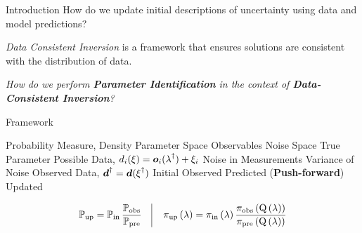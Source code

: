 \begin{block}{Introduction}
\centering
            {\large How do we update initial descriptions of uncertainty using data and model predictions?}

             {\large \emph{Data Consistent Inversion} is a framework that ensures solutions are consistent with the distribution of data.}

             {\large \emph{How do we perform \textbf{Parameter Identification} in the context of \textbf{Data-Consistent Inversion}?} }

\end{block}

\begin{block}{Framework}
\large
    \begin{itemize}
        \itembox{$ \PP, \; \pi $} Probability Measure, Density
         Parameter Space
         Observables
         Noise Space
        \itembox{$\param^\dagger\in\pspace$} True Parameter
         Possible Data, $d_i(\operatorname*{\xi}) = \boldsymbol{o}_i(\operatorname*{\lambda}^\dagger) + \xi_i$
        \itembox{$\noise^\dagger\in\nspace$} Noise in Measurements
        \itembox{$ \sigma $} Variance of Noise
         Observed Data, $\boldsymbol{d}^\dagger = \boldsymbol{d}(\operatorname*{\xi}^\dagger)$
        \itembox{$ \initialP, \; \initial $} Initial
        \itembox{$ \observedP, \; \observed $} Observed
        \itembox{$ \predictedP, \; \predicted $} Predicted (\textbf{Push-forward})
        \itembox{$ \updatedP, \; \updated $} Updated
    \end{itemize}
\centering
    \begin{equation*}
            \dciP \quad \vline \quad \dci
    \end{equation*}

\end{block}

